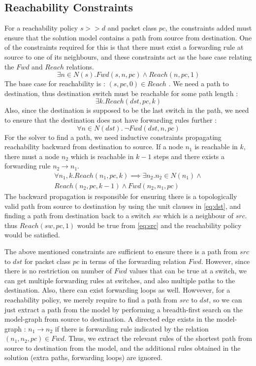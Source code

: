 \documentclass[]{sig}
\begin{document}
\subsection{Reachability Constraints} \label{sec:reach}
For a reachability policy $s >> d$ and packet class $pc$, the constraints added must ensure that the solution model contains a path from source from destination. One of the constraints required for this is that there must exist a forwarding rule at source to one of its neighbours, and these constraints act as the base case relating the $Fwd$ and $Reach$ relations. 
\begin{equation} \label{eq:src}
	\exists n \in N(s). Fwd(s, n, pc) \wedge Reach(n, pc, 1)
\end{equation}
The base case for reachability is : $(s, pc,0) \in Reach$ . We need a path to destination, thus destination switch must be reachable for some path length : 
\begin{equation} \label{eq:dst}
	\exists k. Reach(dst, pc, k)
\end{equation}
Also, since the destination is supposed to be the last switch in the path, we need to ensure that the destination does not have forwarding rules further : 
\begin{equation}
	\forall n \in N(dst). \ \neg Fwd(dst, n, pc)
\end{equation}
For the solver to find a path, we need inductive constraints propagating reachability backward from destination to source. If a node $n_1$ is reachable in $k$, there must a node $n_2$ which is reachable in  $k-1$ steps and there exists a forwarding rule $n_2 \rightarrow n_1$.
\begin{multline} \label{eq:bckprop}
\forall n_1,k.  Reach(n_1,pc,k) \implies \exists n_2.  n_2 \in N(n_1) \wedge \\ Reach(n_2,pc,k-1) \wedge Fwd(n_2,n_1,pc)
\end{multline} 
The backward propagation is responsible for ensuring there is a topologically valid path from source to destination by using the unit clauses in \cref{eq:dst}, and finding a path from destination back to a switch $sw$ which is a neighbour of $src$. thus $Reach(sw,pc,1)$ would be true from \cref{eq:src} and the reachability policy would be satisfied. 

The above mentioned constraints are sufficient to ensure there is a path from $src$ to $dst$ for packet class $pc$ in terms of the forwarding relation $Fwd$. However, since there is no restriction on number of $Fwd$ values that can be true at a switch, we can get multiple forwarding rules at switches, and also multiple paths to the destination. Also, there can exist forwarding loops as well. Howvever, for a reachability policy, we merely require to find a path from $src$ to $dst$, so we can just extract a path from the model by performing a breadth-first search on the model-graph from source to destination. A directed edge exists in the model-graph : $n_1 \rightarrow n_2$ if there is forwarding rule indicated by the relation $(n_1,n_2, pc) \in Fwd$. Thus, we extract the relevant rules of the shortest path from source to destination from the model, and the additional rules obtained in the solution (extra paths, forwarding loops) are ignored.  
\end{document}

